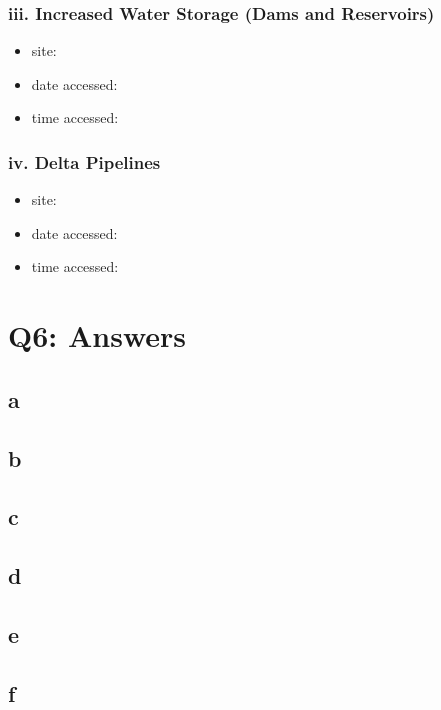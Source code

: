 \documentclass[12pt]{article} %
\begin{document}
		\subsubsection{iii. Increased Water Storage (Dams and Reservoirs)}
			\begin{itemize}
				\item site: 
				\item date accessed: 
				\item time accessed: 
			\end{itemize}
		
		\subsubsection{iv. Delta Pipelines}
			\begin{itemize}
				\item site: 
				\item date accessed: 
				\item time accessed: 
			\end{itemize}


\section{Q6: Answers}

	\subsection{a}
	
	\subsection{b}
	
	\subsection{c}
	
	\subsection{d}
	
	\subsection{e}
	
	\subsection{f}
	
\end{document}
